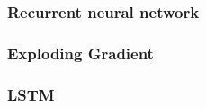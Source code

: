 
\subsubsection{Recurrent neural network}


\subsubsection{Exploding Gradient}


\subsubsection{LSTM}


